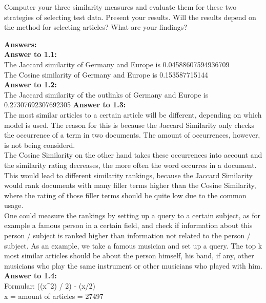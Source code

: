 \documentclass{WeSTassignment}
\begin{document}
Computer your three similarity measures and evaluate them for these two strategies of selecting test data. Present your results. Will the results depend on the method for selecting articles? What are your findings?

\textbf{Answers:}\\
\textbf{Answer to 1.1:} \\
The Jaccard similarity of Germany and Europe is 0.04588607594936709 \\
The Cosine similarity of Germany and Europe is 0.153587715144 \\
\textbf{Answer to 1.2:} \\
The Jaccard similarity of the outlinks of Germany and Europe is 0.27307692307692305
\textbf{Answer to 1.3:} \\
The most similar articles to a certain article will be different, depending on which model is used. The reason for this is because the Jaccard Similarity only checks the occurrence of a term in two documents. The amount of occurrences, however, is not being considerd.\\
The Cosine Similarity on the other hand takes these occurrences into account and the similarity rating decreases, the more often the word occurres in a document.
This would lead to different similarity rankings, because the Jaccard Similarity would rank documents with many filler terms higher than the Cosine Similarity, where the rating of those filler terms should be quite low due to the common usage.\\
One could measure the rankings by setting up a query to a certain subject, as for example a famous person in a certain field, and check if information about this person / subject is ranked higher than information not related to the person / subject. As an example, we take a famous musician and set up a query. The top k most similar articles should be about the person himself, his band, if any, other musicians who play the same instrument or other musicians who played with him. \\
\textbf{Answer to 1.4:} \\
Formular: ((x^2) / 2) - (x/2) \\


x = amount of articles = 27497 
\end{document}
